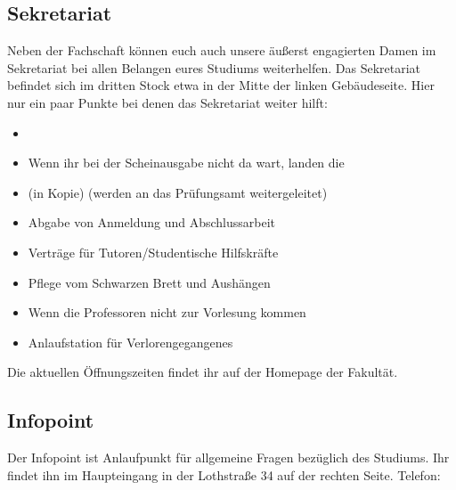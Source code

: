 \subsection{Sekretariat}
Neben der Fachschaft können euch auch unsere äußerst engagierten 
Damen im Sekretariat bei allen Belangen eures Studiums weiterhelfen. 
Das Sekretariat befindet sich im dritten Stock etwa in der Mitte der 
linken Gebäudeseite.\doublebreak
Hier nur ein paar Punkte bei denen das Sekretariat weiter hilft:
\begin{itemize}
	\item {} 
	\item Wenn ihr bei der Scheinausgabe nicht da wart, landen die 	
	\item {} (in Kopie) (werden an das Prüfungsamt weitergeleitet) 
	\item Abgabe von Anmeldung und Abschlussarbeit 
	\item Verträge für Tutoren/Studentische Hilfskräfte 
	\item Pflege vom Schwarzen Brett und Aushängen 
	\item Wenn die Professoren nicht zur Vorlesung kommen
	\item Anlaufstation für Verlorengegangenes
\end{itemize}
Die aktuellen Öffnungszeiten findet ihr auf der Homepage der Fakultät. 

\subsection{Infopoint}
Der Infopoint ist Anlaufpunkt für allgemeine Fragen bezüglich des 
Studiums. Ihr findet ihn im Haupteingang in der Lothstraße 34 auf der 
rechten Seite. Telefon: 